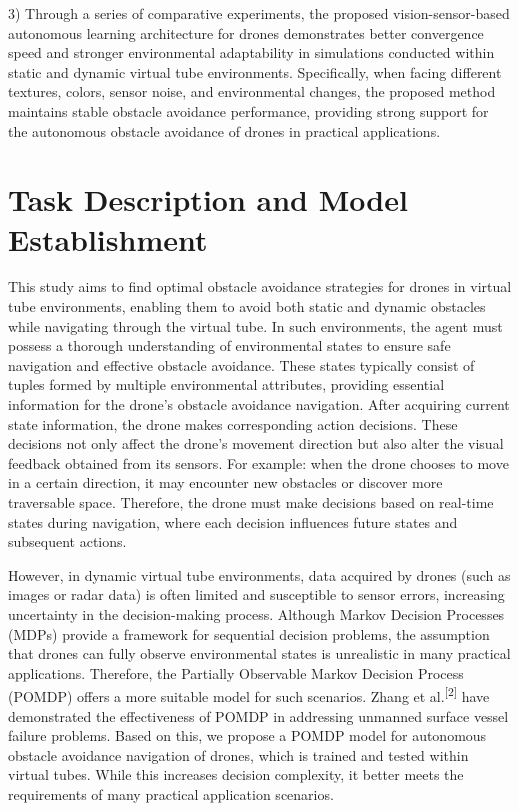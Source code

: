 \documentclass[preprint,12pt,authoryear]{elsarticle}
\begin{document}
3)  Through a series of comparative experiments, the proposed vision-sensor-based autonomous learning architecture for drones demonstrates better convergence speed and stronger environmental adaptability in simulations conducted within static and dynamic virtual tube environments. Specifically, when facing different textures, colors, sensor noise, and environmental changes, the proposed method maintains stable obstacle avoidance performance, providing strong support for the autonomous obstacle avoidance of drones in practical applications.

\section{Task Description and Model Establishment}
This study aims to find optimal obstacle avoidance strategies for drones in virtual tube environments, enabling them to avoid both static and dynamic obstacles while navigating through the virtual tube. In such environments, the agent must possess a thorough understanding of environmental states to ensure safe navigation and effective obstacle avoidance. These states typically consist of tuples formed by multiple environmental attributes, providing essential information for the drone's obstacle avoidance navigation. After acquiring current state information, the drone makes corresponding action decisions. These decisions not only affect the drone's movement direction but also alter the visual feedback obtained from its sensors. For example: when the drone chooses to move in a certain direction, it may encounter new obstacles or discover more traversable space. Therefore, the drone must make decisions based on real-time states during navigation, where each decision influences future states and subsequent actions.

However, in dynamic virtual tube environments, data acquired by drones (such as images or radar data) is often limited and susceptible to sensor errors, increasing uncertainty in the decision-making process. Although Markov Decision Processes (MDPs) provide a framework for sequential decision problems, the assumption that drones can fully observe environmental states is unrealistic in many practical applications. Therefore, the Partially Observable Markov Decision Process (POMDP) offers a more suitable model for such scenarios. Zhang et al.\textsuperscript{[2]} have demonstrated the effectiveness of POMDP in addressing unmanned surface vessel failure problems. Based on this, we propose a POMDP model for autonomous obstacle avoidance navigation of drones, which is trained and tested within virtual tubes. While this increases decision complexity, it better meets the requirements of many practical application scenarios.
\end{document}
